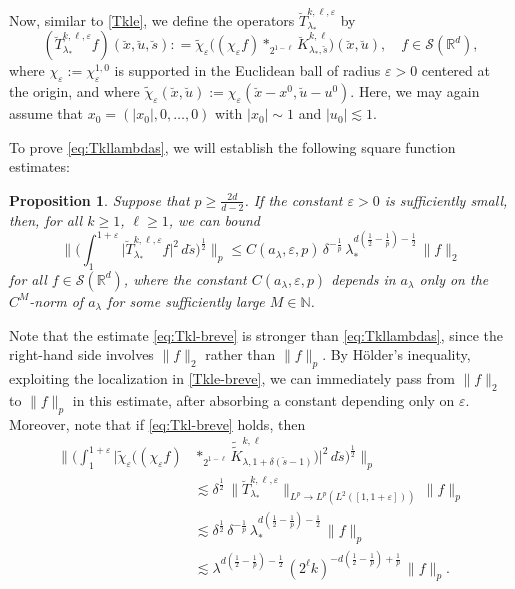 \documentclass[leqno]{amsart}
\newtheorem{proposition}[theorem]{Proposition}
\theoremstyle{definition}
\theoremstyle{remark}
\numberwithin{equation}{section}
\newcommand{\R}{\mathbb{R}}
\newcommand{\N}{\mathbb{N}}
\newcommand{\eps}{\varepsilon}
\newcommand\la{{\lambda}}
\newcommand\ve{{\varepsilon}}
\begin{document}
\smallskip

Now, similar to \eqref{Tkle}, we define the operators $\breve T^{k,\ell,\ve}_{\la_*}$ by
\begin{equation}\label{Tkle-breve}
(\breve T^{k,\ell,\ve}_{\la_*} f)(\breve x,\breve u,\breve s) : = \tilde \chi_\ve \big(( \chi_\ve f) \ast_{2^{1-\ell}} \breve K_{\lambda_*,\breve s}^{k,\ell}\big)(\breve x,\breve u),\quad f\in \mathcal S(\R^d),
\end{equation}
where $\chi_\ve:=\chi^{1,0}_\ve$ is supported in the Euclidean ball of radius $\ve>0$ centered at the origin, and where $\tilde \chi_\ve(\breve x,\breve u):=\chi_\ve(\breve x-x^0,\breve u-u^0)$.  Here,  we may again assume that $x_0=(|x_0|,0,\dots,0)$ with $|x_0|\sim 1$ and $|u_0|\lesssim 1.$
\smallskip

 
 To prove \eqref{eq:Tkllambdas}, we will establish the following square function   estimates: 

\begin{proposition}\label{prop:unit}
Suppose that $p\ge \frac{2d}{d-2}$.
If the constant $\ve>0$ is  sufficiently small, then, for all $k\ge 1$, $\ell\ge 1$, we can bound
\begin{equation}\label{eq:Tkl-breve}
\Big\| \Big( \int_1^{1+\ve} \big| \breve T^{k,\ell,\ve}_{\la_*} f \big|^2 \, d\breve s \Big)^{\frac{1}{2}} \Big\|_p
\le C(a_\lambda,\eps,p)\, \delta^{-\frac 1p} \, \lambda_*^{d(\frac 12 - \frac 1p )-\frac 12}\,\|f\|_2
\end{equation}
for all  $f\in \mathcal S(\R^d)$, where the constant  $C(a_\lambda,\eps, p)$ depends in $a_\la$ only on the $C^M$-norm of $a_\lambda$ for some sufficiently large $M\in\N$.
\end{proposition}

Note that the estimate \eqref{eq:Tkl-breve} is stronger than \eqref{eq:Tkllambdas}, since the right-hand side involves $\|f\|_2$ rather than $\|f\|_p$. By Hölder’s inequality, exploiting the localization in \eqref{Tkle-breve}, we can immediately pass from $\|f\|_2$ to $\|f\|_p$ in this estimate, after absorbing a constant depending only on $\ve$. Moreover, note that if \eqref{eq:Tkl-breve} holds, then
\begin{align*}
  \Big\|\Big( \int_1^{1+\varepsilon} \big|\tilde \chi_\ve \big(( \chi_\ve f) & \ast_{2^{1-\ell}} \tilde{\tilde K}_{\lambda,1+\delta(\breve s-1)}^{k,\ell}\big)\big|^2 \, d\breve s\Big)^{\frac 12} \Big\|_p \\
 & \lesssim \delta^{\frac 12} \, \|\breve T^{k,\ell,\ve}_{\la_*}\|_{L^p\to L^p(L^2([1,1+\varepsilon]))} \, \|f\|_p \\
& \lesssim \delta^{\frac 12}  \, \delta^{-\frac 1p} \, \lambda_*^{d(\frac 12 - \frac 1p )-\frac 12} \, \|f\|_p \\
 & \lesssim  \lambda^{d(\frac 12 - \frac 1p )-\frac 12} \, (2^\ell k)^{-d(\frac 12 - \frac 1p )+\frac 1p} \, \|f\|_p.
\end{align*}
\end{document}
